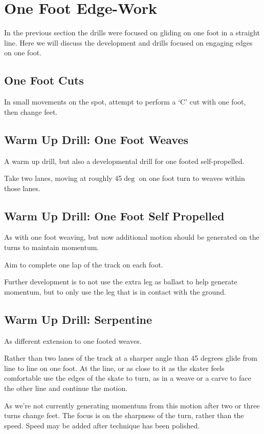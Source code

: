 \section*{One Foot Edge-Work}

In the previous section the drills were focused on gliding on one foot in a straight line.  
Here we will discuss the development and drills focused on engaging edges on one foot. 


\subsection*{One Foot Cuts}

In small movements on the spot, attempt to perform a `C' cut with one foot, then change feet. 



\subsection*{Warm Up Drill: One Foot Weaves} 

A warm up drill, but also a developmental drill for one footed self-propelled.

Take two lanes, moving at roughly 45$\deg$ on one foot turn to weaves within those lanes.    

\subsection*{Warm Up Drill: One Foot Self Propelled} 

As with one foot weaving, but now additional motion should be generated on the turns to maintain momentum.  

Aim to complete one lap of the track on each foot.

Further development is to not use the extra leg as ballast to help generate momentum, but to only use the leg that is in contact with the ground. 

\subsection*{Warm Up Drill: Serpentine} 

As different extension to one footed weaves.

Rather than two lanes of the track at a sharper angle than 45 degrees glide from line to line on one foot. At the line, or as close to it as the skater feels comfortable use the edges of the skate to turn, as in a weave or a carve to face the other line and continue the motion.   

As we're not currently generating momentum from this motion after two or three turns change feet. 
The focus is on the sharpness of the turn, rather than the speed. 
Speed may be added after technique has been polished.

